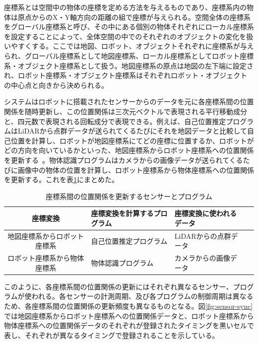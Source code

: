 \documentclass[a4paper]{jreport}	%
\begin{document}
座標系とは空間中の物体の座標を定める方法を与えるものであり、座標系内の物体は原点からのX・Y軸方向の距離の組で座標が与えられる。空間全体の座標系をグローバル座標系と呼び、その中にある個別の物体それぞれにローカル座標系を設定することによって、全体空間の中でのそれぞれのオブジェクトの変化を扱いやすくする。ここでは地図、ロボット、オブジェクトそれぞれに座標系が与えられ、グローバル座標系として地図座標系、ローカル座標系としてロボット座標系・オブジェクト座標系として扱う。地図座標系の原点は地図の左下端に設定され、ロボット座標系・オブジェクト座標系はそれぞれロボット・オブジェクトの中心点と向きから決められる。

システムはロボットに搭載されたセンサーからのデータを元に各座標系間の位置関係を随時更新し、この位置関係は三次元ベクトルで表現される平行移動成分と、四元数で表現される回転成分で表現できる。例えば、自己位置推定プログラムはLiDARから点群データが送られてくるたびにそれを地図データと比較して自己位置を計算し、ロボットが地図座標系にてどの座標に位置するか、ロボットがどの方向を向いているかといった、地図座標系からロボット座標系への位置関係を更新する~\cite{tf}。物体認識プログラムはカメラからの画像データが送られてくるたびに画像中の物体の位置を計算し、ロボット座標系から物体座標系への位置関係を更新する。これを表\ref{table:sensor-prog}にまとめた。

\begin{table}[h]
	\centering
	 \begin{tabular}{clll}
   \hline
    座標変換 & 座標変換を計算するプログラム & 座標変換に使われるデータ \\
    \hline \hline
   地図座標系からロボット座標系 & 自己位置推定プログラム & LiDARからの点群データ \\
   ロボット座標系から物体座標系 & 物体認識プログラム & カメラからの画像データ \\            
   \hline
  \end{tabular} 
  \caption{座標系間の位置関係を更新するセンサーとプログラム}
	\label{table:sensor-prog}
\end{table}


このように、各座標系間の位置関係の更新にはそれぞれ異なるセンサー、プログラムが使われる。各センサーの計測周期、及び各プログラムの制御周期は異なるため、各座標系間の位置関係の更新頻度も異なるものとなる。図\ref{fig:sensor-sync}では地図座標系からロボット座標系への位置関係データと、ロボット座標系から物体座標系への位置関係データのそれぞれが登録されたタイミングを黒いセルで表し、それぞれが異なるタイミングで登録されることを示している。
\end{document}
